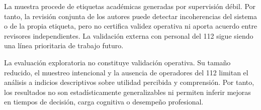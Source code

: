 La muestra procede de etiquetas académicas generadas por supervisión débil. Por tanto,
la revisión conjunta de los autores puede detectar incoherencias del sistema o de la
propia etiqueta, pero no certifica validez operativa ni aporta acuerdo entre revisores
independientes. La validación externa con personal del 112 sigue siendo una línea
prioritaria de trabajo futuro.

La evaluación exploratoria no constituye validación operativa. Su tamaño reducido, el
muestreo intencional y la ausencia de operadores del 112 limitan el análisis a indicios
descriptivos sobre utilidad percibida y comprensión. Por tanto, los resultados no son
estadísticamente generalizables ni permiten inferir mejoras en tiempos de decisión,
carga cognitiva o desempeño profesional.
